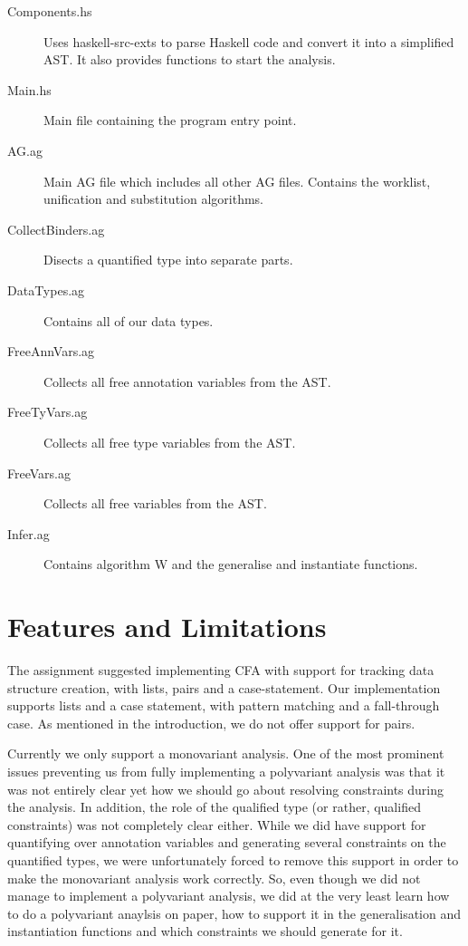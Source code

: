 \documentclass[a4paper]{article}
\begin{document}
\begin{description}
\item [Components.hs] Uses haskell-src-exts to parse Haskell code and convert
it into a simplified AST. It also provides functions to start the analysis.
\item [Main.hs] Main file containing the program entry point.
\item [AG.ag] Main AG file which includes all other AG files. Contains the worklist,
unification and substitution algorithms.
\item [CollectBinders.ag] Disects a quantified type into separate parts.
\item [DataTypes.ag] Contains all of our data types.
\item [FreeAnnVars.ag] Collects all free annotation variables from the AST.
\item [FreeTyVars.ag] Collects all free type variables from the AST.
\item [FreeVars.ag] Collects all free variables from the AST.
\item [Infer.ag] Contains algorithm W and the generalise and instantiate functions.
\end{description}

\section{Features and Limitations}

The assignment suggested implementing CFA with support for tracking data structure
creation, with lists, pairs and a case-statement. Our implementation supports lists and 
a case statement, with pattern matching and a fall-through case. As mentioned in
the introduction, we do not offer support for pairs.

Currently we only support a monovariant analysis. One of the most prominent issues
preventing us from fully implementing a polyvariant analysis was that it was not
entirely clear yet how we should go about resolving constraints during the analysis.
In addition, the role of the qualified type (or rather, qualified constraints)
was not completely clear either. While we did have support for quantifying over
annotation variables and generating several constraints on the quantified types,
we were unfortunately forced to remove this support in order to make the monovariant
analysis work correctly. So, even though we did not manage to implement a polyvariant
analysis, we did at the very least learn how to do a polyvariant anaylsis on paper,
how to support it in the generalisation and instantiation functions and which 
constraints we should generate for it.
\end{document}

